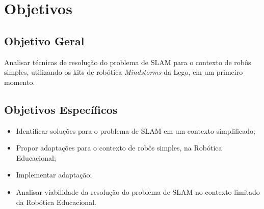 	\section{Objetivos}

	\subsection{Objetivo Geral} %
	\label{sub:objetivos_gerais}

		Analisar técnicas de resolução do problema de SLAM para o contexto de robôs simples, utilizando os kits de robótica \textit{Mindstorms} da Lego, em um primeiro momento.


	\subsection{Objetivos Específicos} %
	\label{sub:objetivos_específicos}

	\begin{itemize}
		\item Identificar soluções para o problema de SLAM em um contexto simplificado;
		\item Propor adaptações para o contexto de robôs simples, na Robótica Educacional;
		\item Implementar adaptação;
		\item Analisar viabilidade da resolução do problema de SLAM no contexto limitado da Robótica Educacional.
	\end{itemize}


